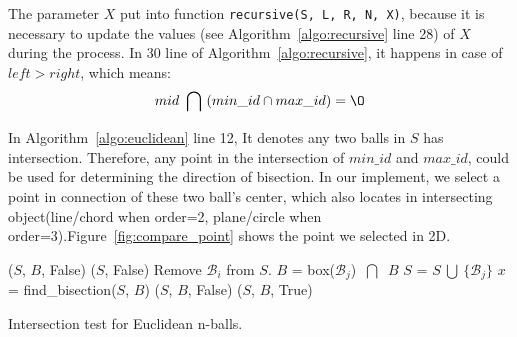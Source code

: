 The parameter $X$ put into function \texttt{recursive(S, L, R, N, X)}, because
it is necessary to update the values (see Algorithm~\ref{algo:recursive} line
28) of $X$ during the process. In 30 line of Algorithm~\ref{algo:recursive}, it
happens in case of $left > right$, which means:
\begin{equation*}
    mid \  \bigcap \  (min\_id \cap max\_id) = \O
\end{equation*}

In Algorithm~\ref{algo:euclidean} line 12, It denotes any two balls in $S$ has
intersection. Therefore, any point in the intersection of $min\_id$ and
$max\_id$, could be used for determining the direction of bisection. In our
implement, we select a point in connection of these two ball's center, which
also locates in intersecting object(line/chord when order=2, plane/circle when
order=3).Figure~\ref{fig:compare_point} shows the point we selected in 2D.



\begin{algorithm}
\begin{algorithmic}[1]
\Input
\EndInput
\Output
\EndOutput

 
    \State \Return ($S$, $B$, False)
\EndIf
{}
    \State \Return ($S$, False) 
\EndIf
{} 
    \State Remove $\mathcal{B}_i$ from $S$. %
\EndIf
\State $B$ = box($\mathcal{B}_j$) $\ \bigcap\ $ $B$
\State $S$ = $S \ \bigcup \  \{\mathcal{B}_j\}$
\State $x$ = find\_bisection($S$, $B$) 
    \State \Return ($S$, $B$, False)
\Else
    \State \Return ($S$, $B$, True)
\EndIf
\end{algorithmic}
\caption{Intersection test for Euclidean n-balls.}
\label{algo:euclidean}
\end{algorithm}


